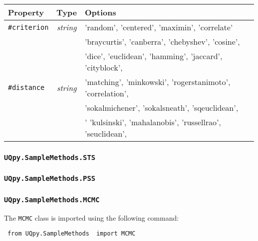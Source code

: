 \documentclass[./UsersGuide.tex]{subfiles}
\begin{document}
\begin{center}
	\begin{tabular}{ |l|c|l| } 
		\hline
		\textbf{Property} & \textbf{Type} & \textbf{Options} \\
		\hline
		\texttt{\#criterion}& \textit{string} &  'random', 'centered', 'maximin', 'correlate'  \\ 
		\hline
		\multirow{5}{*}{\texttt{\#distance}} & \multirow{5}{*}{\textit{string}} & 'braycurtis', 'canberra', 'chebyshev', 'cosine', \\ 
		&  &  'dice', 'euclidean', 'hamming', 'jaccard',  'cityblock',   \\ 
		&  &  'matching', 'minkowski', 'rogerstanimoto',  'correlation', \\ 
		&  & 'sokalmichener', 'sokalsneath', 'sqeuclidean',  \\ 
		&  & ' 'kulsinski', 'mahalanobis', 'russellrao', 'seuclidean',  \\ 
		\hline
	\end{tabular}
\end{center}


\subsubsection{\texttt{UQpy.SampleMethods.STS}}


\subsubsection{\texttt{UQpy.SampleMethods.PSS}}


\subsubsection{\texttt{UQpy.SampleMethods.MCMC}}
\label{Sec:MCMC}

The \texttt{MCMC} class is imported using the following command:

\vspace{4mm}
\texttt{{\color{blue} from} \texttt{UQpy.SampleMethods} {\color{blue} import} MCMC}
\vspace{4mm}
\end{document}
